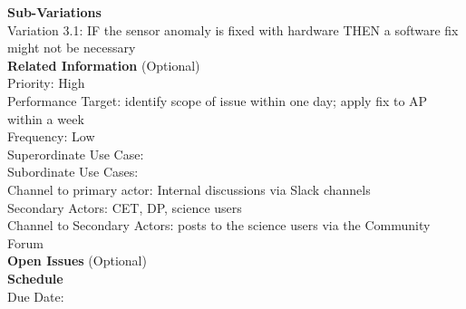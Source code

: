 {\bf Sub-Variations} \\
Variation 3.1: IF the sensor anomaly is fixed with hardware THEN a software fix might not be necessary \\

{\bf Related Information} (Optional) \\
Priority: High  \\
Performance Target: identify scope of issue within one day; apply fix to AP within a week \\
Frequency: Low \\
Superordinate Use Case:  \\
Subordinate Use Cases: \\
Channel to primary actor: Internal discussions via Slack channels \\
Secondary Actors: CET, DP, science users \\
Channel to Secondary Actors: posts to the science users via the Community Forum \\

{\bf Open Issues} (Optional) \\

{\bf Schedule} \\
Due Date: \\
